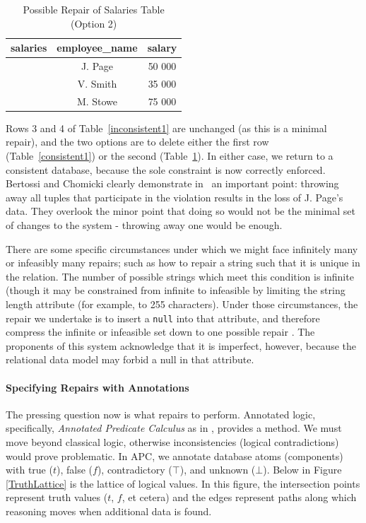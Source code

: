 \begin{table}[h]\begin{center}
        \begin{tabular}{r | c  c} 
					salaries & employee\_name & salary \\ \hline
	           		 & J. Page  & 50 000 \\ 
					 & V. Smith & 35 000 \\ 
					 & M. Stowe & 75 000 \\ 
        \end{tabular}
        \caption[Possible Repair of Salaries Table (Option 2)]{Possible Repair of Salaries Table (Option 2) \cite{CQ}\label{consistent2}}
\end{center}\end{table}

Rows 3 and 4 of Table~\ref{inconsistent1} are unchanged (as this is a minimal repair), and the two options are to delete either the first row (Table~\ref{consistent1}) or the second (Table~\ref{consistent2}). In either case, we return to a consistent database, because the sole constraint is now correctly enforced. Bertossi and Chomicki clearly demonstrate in~\cite{CQ} an important point: throwing away all tuples that participate in the violation results in the loss of J. Page's data. They overlook the minor point that doing so would not be the minimal set of changes to the system - throwing away one would be enough.

There are some specific circumstances under which we might face infinitely many or infeasibly many repairs; such as how to repair a string such that it is unique in the relation. The number of possible strings which meet this condition is infinite (though it may be constrained from infinite to infeasible by limiting the string length attribute (for example, to 255 characters). Under those circumstances, the repair we undertake is to insert a \texttt{null} into that attribute, and therefore compress the infinite or infeasible set down to one possible repair \cite{CQ}. The proponents of this system acknowledge that it is imperfect, however, because the relational data model may forbid a null in that attribute.

\paragraph{Specifying Repairs with Annotations}
The pressing question now is what repairs to perform. Annotated logic, specifically, \textit{Annotated Predicate Calculus} as in \cite{CQ}, provides a method. We must move beyond classical logic, otherwise inconsistencies (logical contradictions) would prove problematic. In APC, we annotate database atoms (components) with true ($t$), false ($f$), contradictory ($\top$), and unknown ($\bot$). Below in Figure \ref{TruthLattice} is the lattice of logical values. In this figure, the intersection points represent truth values ($t$, $f$, et cetera) and the edges represent paths along which reasoning moves when additional data is found.

